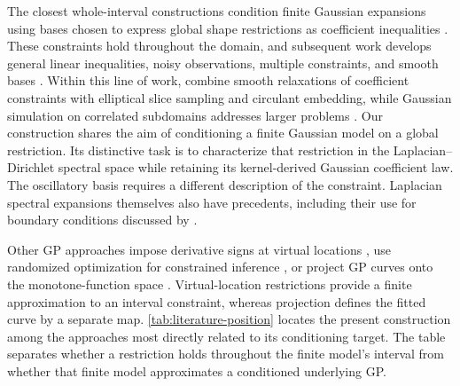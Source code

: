 The closest whole-interval constructions condition finite Gaussian
expansions using bases chosen to express global shape restrictions as coefficient
inequalities \citep{maatouk2017constraints}. These constraints hold
throughout the domain, and subsequent work develops general linear
inequalities, noisy observations, multiple constraints, and smooth
bases \citep{lopera2018finite,lopera2020noisy,maatouk2025bayesian}.
Within this line of work, \citet{ray2020shaperestricted} combine
smooth relaxations of coefficient constraints with elliptical slice
sampling and circulant embedding, while Gaussian simulation on
correlated subdomains addresses larger problems
\citep{maatouk2025largescale}. Our construction shares the aim of
conditioning a finite Gaussian model on a global restriction. Its
distinctive task is to characterize that restriction in the
Laplacian--Dirichlet spectral space while retaining its kernel-derived
Gaussian coefficient law. The oscillatory basis requires a different
description of the constraint. Laplacian spectral expansions themselves
also have precedents, including their use for boundary conditions
discussed by \citet{swiler2020survey}.

Other GP approaches impose derivative signs at virtual locations
\citep{riihimaki2010monotonicity,agrell2019operators}, use randomized
optimization for constrained inference \citep{zhang2026rlrto}, or
project GP curves onto the monotone-function space
\citep{lin2014projection}. Virtual-location restrictions provide a
finite approximation to an interval constraint, whereas projection
defines the fitted curve by a separate map. \cref{tab:literature-position}
locates the present construction among the approaches most directly
related to its conditioning target. The table separates whether a
restriction holds throughout the finite model's interval from whether
that finite model approximates a conditioned underlying GP.

